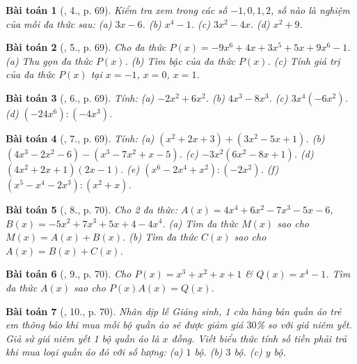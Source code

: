 \documentclass{article}
\newtheorem{baitoan}{Bài toán}
\begin{document}
\begin{baitoan}[\cite{SGK_Toan_7_Canh_Dieu_tap_2}, 4., p. 69]
	Kiểm tra xem trong các số $-1,0,1,2$, số nào là nghiệm của mỗi đa thức sau: (a) $3x - 6$. (b) $x^4 - 1$. (c) $3x^2 - 4x$. (d) $x^2 + 9$.
\end{baitoan}

\begin{baitoan}[\cite{SGK_Toan_7_Canh_Dieu_tap_2}, 5., p. 69]
	Cho đa thức $P(x) = -9x^6 + 4x + 3x^5 + 5x + 9x^6 - 1$. (a) Thu gọn đa thức $P(x)$. (b) Tìm bậc của đa thức $P(x)$. (c) Tính giá trị của đa thức $P(x)$ tại $x = -1$, $x = 0$, $x = 1$.
\end{baitoan}

\begin{baitoan}[\cite{SGK_Toan_7_Canh_Dieu_tap_2}, 6., p. 69]
	Tính: (a) $-2x^2 + 6x^2$. (b) $4x^3 - 8x^3$. (c) $3x^4(-6x^2)$. (d) $(-24x^6):(-4x^3)$.
\end{baitoan}

\begin{baitoan}[\cite{SGK_Toan_7_Canh_Dieu_tap_2}, 7., p. 69]
	Tính: (a) $(x^2 + 2x + 3) + (3x^2 - 5x + 1)$. (b) $(4x^3 - 2x^2 - 6) - (x^3 - 7x^2 + x - 5)$. (c) $-3x^2(6x^2 - 8x + 1)$. (d) $(4x^2 + 2x + 1)(2x - 1)$. (e) $(x^6 - 2x^4 + x^2):(-2x^2)$. (f) $(x^5 - x^4 - 2x^3):(x^2 + x)$.
\end{baitoan}

\begin{baitoan}[\cite{SGK_Toan_7_Canh_Dieu_tap_2}, 8., p. 70]
	Cho 2 đa thức: $A(x) = 4x^4 + 6x^2 - 7x^3 - 5x - 6$, $B(x) = -5x^2 + 7x^3 + 5x + 4 - 4x^4$. (a) Tìm đa thức $M(x)$ sao cho $M(x) = A(x) + B(x)$. (b) Tìm đa thức $C(x)$ sao cho $A(x) = B(x) + C(x)$.
\end{baitoan}

\begin{baitoan}[\cite{SGK_Toan_7_Canh_Dieu_tap_2}, 9., p. 70]
	Cho $P(x) = x^3 + x^2 + x +1$ \& $Q(x) = x^4 - 1$. Tìm đa thức $A(x)$ sao cho $P(x)A(x) = Q(x)$. 
\end{baitoan}

\begin{baitoan}[\cite{SGK_Toan_7_Canh_Dieu_tap_2}, 10., p. 70]
	Nhân dịp lễ Giáng sinh, 1 cửa hàng bán quần áo trẻ em thông báo khi mua mỗi bộ quần áo sẽ được giảm giá $30$\% so với giá niêm yết. Giả sử giá niêm yết 1 bộ quần áo là $x$ đồng. Viết biểu thức tính số tiền phải trả khi mua loại quần áo đó với số lượng: (a) $1$ bộ. (b) $3$ bộ. (c) $y$ bộ.
\end{baitoan}
\end{document}

